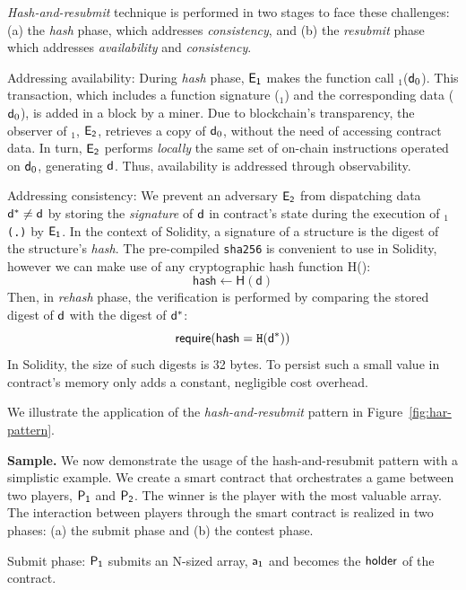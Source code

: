 \noindent
\emph{Hash-and-resubmit} technique is performed in two
stages to face these challenges: (a) the \emph{hash} phase, which addresses
\emph{consistency}, and (b) the \emph{resubmit} phase which addresses
\emph{availability} and \emph{consistency}.

\noindent \textsf{Addressing availability:} During \emph{hash} phase,
$\mathsf{E_{1}}$ makes the function call \texttt{\proc}$_1$($\mathsf{d}_0$). This
transaction, which includes a function signature (\texttt{\proc$_1$}) and the
corresponding data ($\mathsf{d}_0$), is added in a block by a miner. Due to
blockchain's transparency, the observer of \texttt{\proc}$_1$, $\mathsf{E_{2}}$,
retrieves a copy of $\mathsf{d}_0$, without the need of accessing contract data. In
turn, $\mathsf{E_{2}}$ performs \emph{locally} the same set of on-chain instructions
operated on $\mathsf{d}_0$, generating $\mathsf{d}$. Thus, availability is addressed
through observability.

\noindent \textsf{Addressing consistency:} We prevent an adversary $\mathsf{E_{2}}$
from dispatching data $\mathsf{d^*}\neq\mathsf{d}$ by storing the \emph{signature} of
$\mathsf{d}$ in contract's state during the execution of \texttt{\proc$_1$(.)} by
$\mathsf{E_{1}}$. In the context of Solidity, a signature of a structure is the
digest of the structure's \emph{hash}. The pre-compiled \texttt{sha256} is
convenient to use in Solidity, however we can make use of any cryptographic
hash function \textsf{H()}: \[\textsf{hash} \gets \textsf{H}(\textsf{d})\]
Then, in \emph{rehash} phase, the verification is performed by comparing the
stored digest of $\mathsf{d}$ with the digest of $\mathsf{d^*}$:
\[\textsf{require}(\textsf{hash} = \texttt{H}(\mathsf{d^*}))\] \noindent In Solidity,
the size of such digests is 32 bytes. To persist such a small value in
contract's memory only adds a constant, negligible cost overhead.

We illustrate the application of the \emph{hash-and-resubmit} pattern in
Figure~\ref{fig:har-pattern}.

\noindent \textbf{Sample.} We now demonstrate the usage of the
hash-and-resubmit pattern with a simplistic example. We create a smart contract
that orchestrates a game between two players, $\mathsf{P_1}$ and $\mathsf{P_2}$. The winner is
the player with the most valuable array. The interaction between players
through the smart contract is realized in two phases: (a) the submit phase and
(b) the contest phase.

\noindent \textsf{Submit phase:} $\mathsf{P_1}$ submits an N-sized array, $\mathsf{a_1}$ and
becomes the $\mathsf{holder}$ of the contract.

